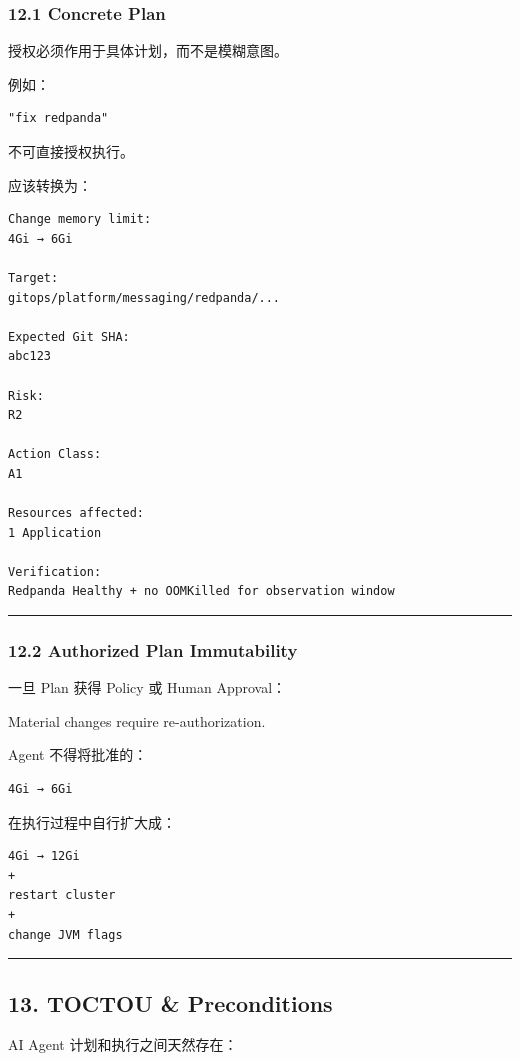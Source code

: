 \documentclass[11pt,a4paper]{article}
\begin{document}
\subsubsection{12.1 Concrete Plan}
授权必须作用于具体计划，而不是模糊意图。

例如：

\begin{lstlisting}[language=text]
"fix redpanda"
\end{lstlisting}
不可直接授权执行。

应该转换为：

\begin{lstlisting}[language=text]
Change memory limit:
4Gi → 6Gi

Target:
gitops/platform/messaging/redpanda/...

Expected Git SHA:
abc123

Risk:
R2

Action Class:
A1

Resources affected:
1 Application

Verification:
Redpanda Healthy + no OOMKilled for observation window
\end{lstlisting}
\vspace{0.5em}\hrule\vspace{0.5em}
\subsubsection{12.2 Authorized Plan Immutability}
一旦 Plan 获得 Policy 或 Human Approval：

\begin{gfmBlockquote}
Material changes require re-authorization.
\end{gfmBlockquote}
Agent 不得将批准的：

\begin{lstlisting}[language=text]
4Gi → 6Gi
\end{lstlisting}
在执行过程中自行扩大成：

\begin{lstlisting}[language=text]
4Gi → 12Gi
+
restart cluster
+
change JVM flags
\end{lstlisting}
\vspace{0.5em}\hrule\vspace{0.5em}
\subsection{13. TOCTOU \& Preconditions}
AI Agent 计划和执行之间天然存在：
\end{document}
